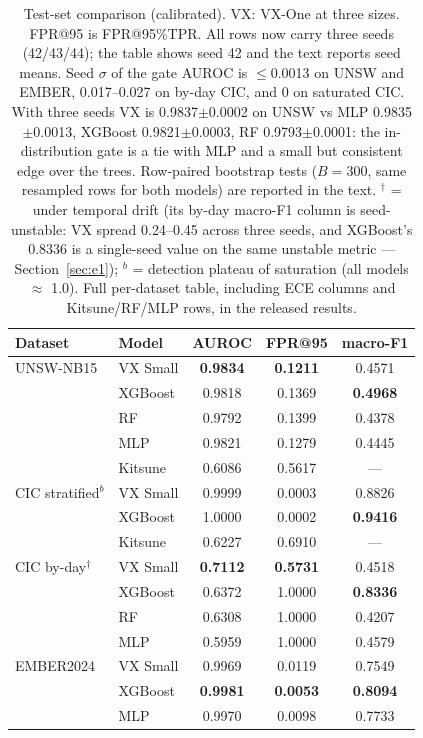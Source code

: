 \documentclass[sigconf,anonymous=false]{acmart}
\begin{document}
\begin{table}[t]
\caption{Test-set comparison (calibrated). VX: VX-One at three sizes. FPR@95 is FPR@95\%TPR. All rows now carry three seeds (42/43/44); the table shows seed 42 and the text reports seed means. Seed $\sigma$ of the gate AUROC is $\le$0.0013 on UNSW and EMBER, 0.017--0.027 on by-day CIC, and 0 on saturated CIC. With three seeds VX is 0.9837$\pm$0.0002 on UNSW vs MLP 0.9835$\pm$0.0013, XGBoost 0.9821$\pm$0.0003, RF 0.9793$\pm$0.0001: the in-distribution gate is a tie with MLP and a small but consistent edge over the trees. Row-paired bootstrap tests ($B{=}300$, same resampled rows for both models) are reported in the text. $^{\dagger}$ = under temporal drift (its by-day macro-F1 column is seed-unstable: VX spread 0.24--0.45 across three seeds, and XGBoost's 0.8336 is a single-seed value on the same unstable metric --- Section~\ref{sec:e1}); $^{b}$ = detection plateau of saturation (all models $\approx$ 1.0). Full per-dataset table, including ECE columns and Kitsune/RF/MLP rows, in the released results.}
\label{tab:e1}
\small
\begin{tabular}{llccc}
\toprule
Dataset & Model & AUROC & FPR@95 & macro-F1 \\
\midrule
UNSW-NB15 & VX Small & \textbf{0.9834} & \textbf{0.1211} & 0.4571 \\
          & XGBoost  & 0.9818 & 0.1369 & \textbf{0.4968} \\
          & RF       & 0.9792 & 0.1399 & 0.4378 \\
          & MLP      & 0.9821 & 0.1279 & 0.4445 \\
          & Kitsune  & 0.6086 & 0.5617 & --- \\
\midrule
CIC stratified$^{b}$ & VX Small & 0.9999 & 0.0003 & 0.8826 \\
                     & XGBoost & 1.0000 & 0.0002 & \textbf{0.9416} \\
                     & Kitsune & 0.6227 & 0.6910 & --- \\
\midrule
CIC by-day$^{\dagger}$ & VX Small & \textbf{0.7112} & \textbf{0.5731} & 0.4518 \\
                       & XGBoost & 0.6372 & 1.0000 & \textbf{0.8336} \\
                       & RF & 0.6308 & 1.0000 & 0.4207 \\
                       & MLP & 0.5959 & 1.0000 & 0.4579 \\
\midrule
EMBER2024 & VX Small & 0.9969 & 0.0119 & 0.7549 \\
          & XGBoost  & \textbf{0.9981} & \textbf{0.0053} & \textbf{0.8094} \\
          & MLP      & 0.9970 & 0.0098 & 0.7733 \\
\bottomrule
\end{tabular}
\end{table}
\end{document}
